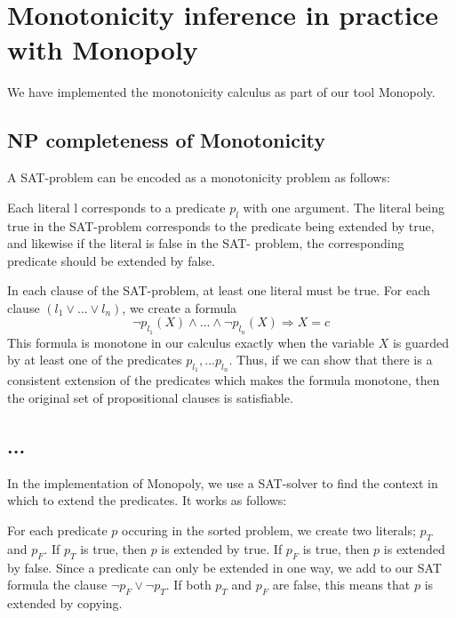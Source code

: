 \section{Monotonicity inference in practice with Monopoly}

We have implemented the monotonicity calculus as part of our tool
Monopoly.

\subsection{NP completeness of Monotonicity}

  A SAT-problem can be encoded as a monotonicity problem as follows:

  Each literal l corresponds to a predicate $p_l$ with one argument.
  The literal being true in the SAT-problem corresponds to the predicate
  being extended by true, and likewise if the literal is false in the SAT-
  problem, the corresponding predicate should be extended by false. 
  
  In each clause of the SAT-problem, at least one literal must be true.
  For each clause $(l_1 \vee ...\vee l_n)$, we create a formula
  $$ \neg p_{l_1}(X) \wedge ... \wedge \neg p_{l_n}(X) \Rightarrow X = c $$
  This formula is monotone in our calculus exactly when the variable $X$ 
  is guarded by at least one of the predicates $p_{l_1},...p_{l_n}$.
  Thus, if we can show that there is a consistent extension of the predicates
  which makes the formula monotone, then the original set of propositional 
  clauses is satisfiable.

\subsection{...}

  In the implementation of Monopoly, we use a SAT-solver to find the context 
  in which to extend the predicates. It works as follows:

  For each predicate $p$ occuring in the sorted problem, we create two literals;
  $p_T$ and $p_F$. If $p_T$ is true, then $p$  is extended by true. 
  If $p_F$ is true, then $p$ is extended by false. Since a predicate can only
  be extended in one way, we add to our SAT formula the clause $\neg p_F \vee \neg p_T$.
  If both $p_T$ and $p_F$ are false, this means that $p$ is extended by copying.


  


